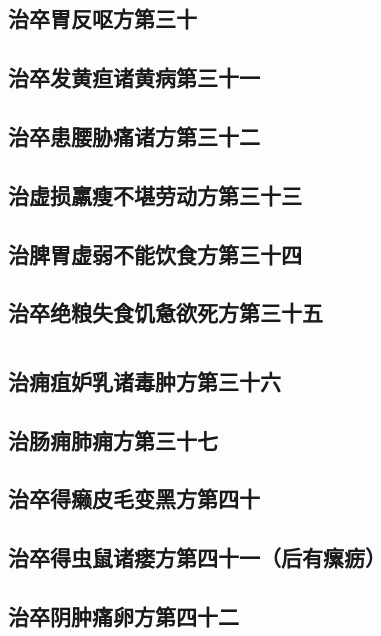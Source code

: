 \documentclass[12pt,UTF8]{ctexbook}
\begin{document}
\chapter{治卒胃反呕方第三十}
\chapter{治卒发黄疸诸黄病第三十一}
\chapter{治卒患腰胁痛诸方第三十二}
\chapter{治虚损羸瘦不堪劳动方第三十三}
\chapter{治脾胃虚弱不能饮食方第三十四}
\chapter{治卒绝粮失食饥惫欲死方第三十五}

\part{}

\chapter{治痈疽妒乳诸毒肿方第三十六}
\chapter{治肠痈肺痈方第三十七}
\chapter{治卒得癞皮毛变黑方第四十}
\chapter{治卒得虫鼠诸瘘方第四十一（后有瘰疬）}
\chapter{治卒阴肿痛卵方第四十二}

\part{}
\end{document}
